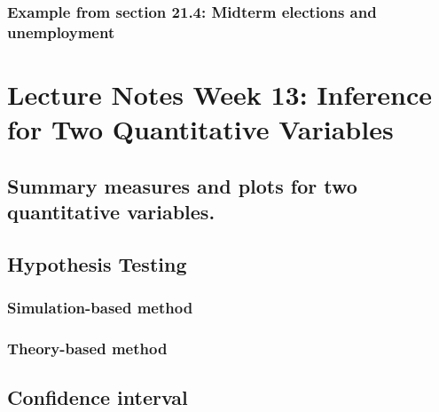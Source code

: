 \documentclass[
]{report}
\begin{document}
\hypertarget{example-from-section-21.4-midterm-elections-and-unemployment}{%
\subsubsection*{Example from section 21.4: Midterm elections and unemployment}\label{example-from-section-21.4-midterm-elections-and-unemployment}}

\hypertarget{lecture-notes-week-13-inference-for-two-quantitative-variables}{%
\section{Lecture Notes Week 13: Inference for Two Quantitative Variables}\label{lecture-notes-week-13-inference-for-two-quantitative-variables}}

\hypertarget{summary-measures-and-plots-for-two-quantitative-variables.}{%
\subsection*{Summary measures and plots for two quantitative variables.}\label{summary-measures-and-plots-for-two-quantitative-variables.}}

\hypertarget{hypothesis-testing-5}{%
\subsection*{Hypothesis Testing}\label{hypothesis-testing-5}}

\hypertarget{simulation-based-method-8}{%
\subsubsection*{Simulation-based method}\label{simulation-based-method-8}}

\hypertarget{theory-based-method-5}{%
\subsubsection*{Theory-based method}\label{theory-based-method-5}}

\hypertarget{confidence-interval-9}{%
\subsection*{Confidence interval}\label{confidence-interval-9}}
\end{document}
